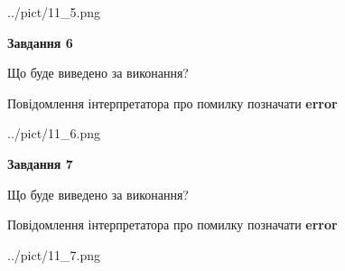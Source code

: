 \documentclass[10pt, ukrainian]{article}
\begin{document}
{\begin {large}
\begin{center}
	{../pict/11_5.png}
\end{center}
\newpage

{\begin {center}\textbf{Завдання 6}\end {center}}\par
Що буде виведено за виконання? \par
Повідомлення інтерпретатора про помилку позначати \textbf{error}

\begin{center}
	{../pict/11_6.png}
\end{center}
\newpage

{\begin {center}\textbf{Завдання 7}\end {center}}\par
Що буде виведено за виконання? \par
Повідомлення інтерпретатора про помилку позначати \textbf{error}

\begin{center}
	{../pict/11_7.png}
\end{center}
\newpage

\end {large}}
\end{document}
